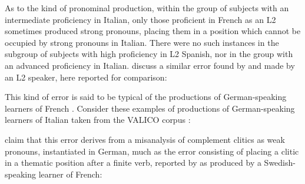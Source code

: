 \documentclass[output=paper,modfonts,nonflat,newtxmath]{langsci/langscibook}
\begin{document}
As to the kind of pronominal production, within the group of subjects with an intermediate proficiency in Italian, only those proficient in French as an L2 sometimes produced strong pronouns, placing them in a position which cannot be occupied by strong pronouns in Italian. There were no such instances in the subgroup of subjects with high proficiency in L2 Spanish, nor in the group with an advanced proficiency in Italian. \citet{HamannBelletti2006} discuss a similar error found by \citet[355]{GranfeldtSchlyter2004} and made by an L2 speaker, here reported for comparison:

\z

This kind of error is said to be typical of the productions of German-speaking learners of French \citep{Herschensohn2004}. Consider these examples of productions of German-speaking learners of Italian taken from the VALICO corpus \citep[48, 55]{Corino2012}:


\z


\citet{HamannBelletti2006} claim that this error derives from a misanalysis of complement clitics as weak pronouns, instantiated in German, much as the error consisting of placing a clitic in a thematic position after a finite verb, reported by \citet[355]{GranfeldtSchlyter2004} as produced by a Swedish-speaking learner of French:

\z
\end{document}
